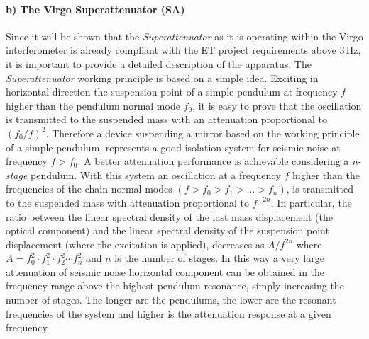 \paragraph{b) The Virgo Superattenuator (SA)}

Since it will be shown that the \emph{Superattenuator} as it is operating within the Virgo interferometer is already compliant with the ET project requirements above 3\,Hz, it is important to provide a detailed description of the apparatus.
The \emph{Superattenuator} working principle is based on a simple idea. Exciting in horizontal direction the suspension point of a simple pendulum at frequency $f$ higher than the pendulum normal mode $f_0$, it is easy to prove that the oscillation is transmitted to the suspended mass with an attenuation proportional to $(f_0/f)^{2}$. Therefore a device suspending a mirror based on the working principle of a simple pendulum, represents a good isolation system for seismic noise at frequency $f > f_0$.
A better attenuation performance is achievable considering a \emph{n-stage} pendulum. With this system an oscillation at a frequency $f$ higher than the frequencies of the chain normal modes $(f>f_0>f_1> \ldots >f_n)$, is transmitted to the suspended mass with attenuation proportional to $f^{-2n}$. In particular, the ratio between the linear spectral density of the last mass displacement (the optical component) and the linear spectral density of the suspension point displacement (where the excitation is applied), decreases as $A/f^{2n}$ where 
$A=f_0^{2}\cdot f_1^{2} \cdot f_2^{2} \cdots f_n^{2}$ and $n$ is the number of stages. In this way a very large attenuation of seismic noise horizontal component can be obtained in the frequency range above the highest pendulum resonance, simply increasing the number of stages. The longer are the pendulums, the lower are the resonant frequencies of the system and higher is the attenuation response at a given frequency.


